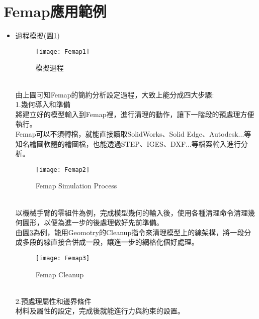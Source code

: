 \section{Femap應用範例}
\begin{itemize}
\item 過程模擬(圖\ref{3.02})\\
\begin{figure}[hbt!]
\begin{center}
\texttt{[image: Femap1]}
\caption{\Large 模擬過程}\label{3.02}
\end{center}
\end{figure}
\\
\qquad 由上圖可知Femap的簡約分析設定過程，大致上能分成四大步驟:\\

1.幾何導入和準備\\

\qquad 將建立好的模型輸入到Femap裡，進行清理的動作，讓下一階段的預處理方便執行。\\

\qquad Femap可以不須轉檔，就能直接讀取SolidWorks、Solid Edge、Autodesk...等知名繪圖軟體的繪圖檔，也能透過STEP、IGES、DXF...等檔案輸入進行分析。\\
\begin{figure}[hbt!]
\begin{center}
\texttt{[image: Femap2]}
\caption{\Large Femap Simulation Process}\label{3.03}
\end{center}
\end{figure}
\\

\qquad 以機械手臂的零組件為例，完成模型幾何的輸入後，使用各種清理命令清理幾何圖形，以便為進一步的後處理做好先前準備。\\

\qquad 由圖\ref{3.01}為例，能用Geomotry的Cleanup指令來清理模型上的線架構，將一段分成多段的線直接合併成一段，讓進一步的網格化個好處理。\\
\begin{figure}[hbt!]
\begin{center}
\texttt{[image: Femap3]}
\caption{\Large Femap Cleanup}\label{3.01}
\end{center}
\end{figure}
\\
2.預處理屬性和邊界條件\\

\qquad 材料及屬性的設定，完成後就能進行力與約束的設置。\\


\end{itemize}
